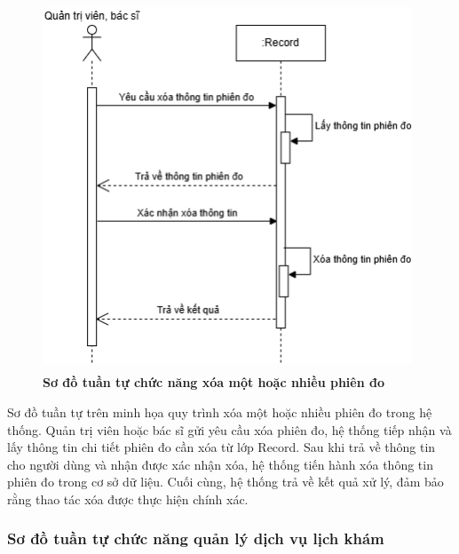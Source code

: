 \begin{figure}[H]
	\centering
	\includegraphics[width=11cm,height=11cm]{Images/sequence/record/delete.drawio.png}
	\caption[Sơ đồ tuần tự chức năng xóa một hoặc nhiều phiên đo]{\bfseries \fontsize{12pt}{0pt}
		\selectfont Sơ đồ tuần tự chức năng xóa một hoặc nhiều phiên đo}
	\label{sequence_delete_record} %
\end{figure}
Sơ đồ tuần tự trên minh họa quy trình xóa một hoặc nhiều phiên đo trong hệ thống. Quản trị viên hoặc bác sĩ gửi yêu cầu xóa phiên đo, hệ thống tiếp nhận và lấy thông tin chi tiết phiên đo cần xóa từ lớp Record.
Sau khi trả về thông tin cho người dùng và nhận được xác nhận xóa, hệ thống tiến hành xóa thông tin phiên đo trong cơ sở dữ liệu. Cuối cùng, hệ thống trả về kết quả xử lý, đảm bảo rằng thao tác xóa được thực hiện chính xác.

\subsubsection{Sơ đồ tuần tự chức năng quản lý dịch vụ lịch khám}

